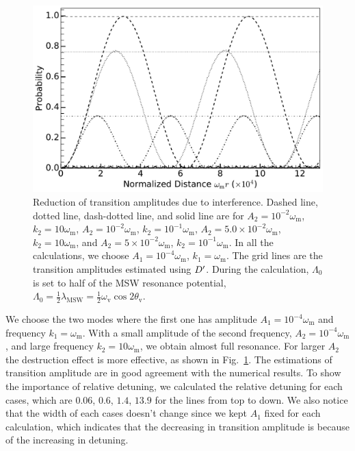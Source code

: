 \begin{figure}[!htbp]
                \centering
                \includegraphics[width=\columnwidth]{chapters/assets/rabi/interference-reduction}
                \caption{Reduction of transition amplitudes due to interference. Dashed line, dotted line, dash-dotted line, and solid line are for $A_2=10^{-2}\omega_{\mathrm{m}}$, $k_2=10\omega_{\mathrm m}$, $A_2=10^{-2}\omega_{\mathrm{m}}$, $k_2=10^{-1}\omega_{\mathrm m}$, $A_2=5.0\times 10^{-2}\omega_{\mathrm{m}}$, $k_2=10\omega_{\mathrm m}$, and $A_2=5\times 10^{-2}\omega_{\mathrm{m}}$, $k_2=10^{-1}\omega_{\mathrm m}$. In all the calculations, we choose $A_1=10^{-4}\omega_{\mathrm m}$, $k_1=\omega_{\mathrm m}$. The grid lines are the transition amplitudes estimated using $D'$. During the calculation, $\Lambda_0$ is set to half of the MSW resonance potential, $\Lambda_0 = \frac{1}{2}\lambda_{\mathrm{MSW}}=\frac{1}{2}\omega_{\mathrm{v}}\cos 2\theta_{\mathrm v}$.}
                \label{fig-rabi-oscillations-energy-gap-change}
\end{figure}


We choose the two modes where the first one has amplitude $A_1 = 10^{-4}\omega_{\mathrm{m}}$ and frequency $k_1 = \omega_{\mathrm{m}}$. With a small amplitude of the second frequency, $A_2=10^{-4}\omega_{\mathrm{m}}$, and large frequency $k_2=10\omega_{\mathrm{m}}$, we obtain almost full resonance. For larger $A_2$ the destruction effect is more effective, as shown in Fig.~\ref{fig-rabi-oscillations-energy-gap-change}. The estimations of transition amplitude are in good agreement with the numerical results. To show the importance of relative detuning, we calculated the relative detuning for each cases, which are $0.06$, $0.6$, $1.4$, $13.9$ for the lines from top to down. We also notice that the width of each cases doesn't change since we kept $A_1$ fixed for each calculation, which indicates that the decreasing in transition amplitude is because of the increasing in detuning.

